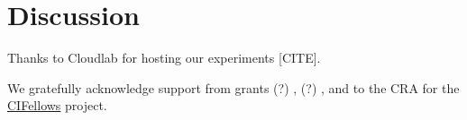 \documentclass[acmsmall,review,anonymous]{acmart}
\begin{document}
\clearpage

\section{Discussion}
\label{s:conclusion}
\label{s:discussion}



\begin{acks}
  Thanks to Cloudlab for hosting our experiments [CITE].

We gratefully acknowledge support from
 grants
  (?) \href{"https://www.nsf.gov/awardsearch/showAward?AWD_ID=1763922"}{},
  (?) \href{"https://www.nsf.gov/awardsearch/showAward?AWD_ID=1823244"}{},
 and
 \href{"https://www.nsf.gov/awardsearch/showAward?AWD_ID=2030859"}{}
  to the CRA for the \href{https://cifellows2020.org}{CIFellows} project.
\end{acks}



\end{document}
